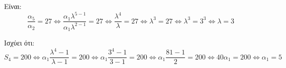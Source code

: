 
\begin{alist}
\item Είναι:
\[\dfrac{\alpha_5}{\alpha_2} = 27 \Leftrightarrow \dfrac{\alpha_1 \lambda^{5-1}}{\alpha_1 \lambda^{2-1}} = 27 \Leftrightarrow \dfrac{\lambda^4}{\lambda} = 27 \Leftrightarrow \lambda^3 = 27 \Leftrightarrow \lambda^3 = 3^3 \Leftrightarrow \lambda = 3\]

\item Ισχύει ότι:
\[S_4 = 200 \Leftrightarrow \alpha_1 \dfrac{\lambda^4 - 1}{\lambda - 1} = 200 \Leftrightarrow \alpha_1 \dfrac{3^4 - 1}{3 - 1} = 200 \Leftrightarrow \alpha_1 \dfrac{81 - 1}{2} = 200 \Leftrightarrow 40\alpha_1 = 200 \Leftrightarrow \alpha_1 = 5\]
\end{alist}

